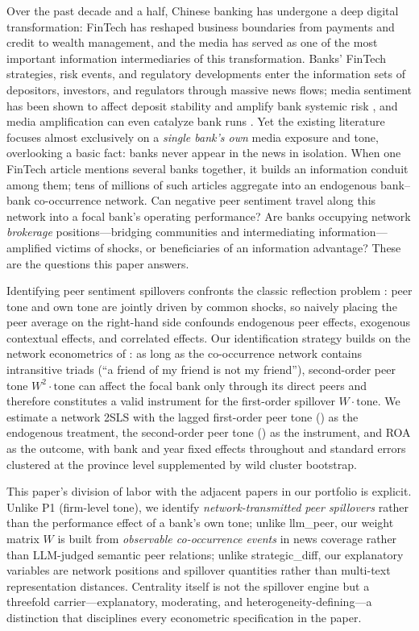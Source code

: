 Over the past decade and a half, Chinese banking has undergone a deep
digital transformation: FinTech has reshaped business boundaries from
payments and credit to wealth management, and the media has served as
one of the most important information intermediaries of this
transformation. Banks' FinTech strategies, risk events, and
regulatory developments enter the information sets of depositors,
investors, and regulators through massive news flows; media sentiment
has been shown to affect deposit stability and amplify bank systemic
risk \parencite{fang2024media}, and media amplification can even
catalyze bank runs \parencite{cookson2026social}. Yet the existing
literature focuses almost exclusively on a \emph{single bank's own}
media exposure and tone, overlooking a basic fact: banks never appear
in the news in isolation. When one FinTech article mentions several
banks together, it builds an information conduit among them; tens of
millions of such articles aggregate into an endogenous bank--bank
co-occurrence network. Can negative peer sentiment travel along this
network into a focal bank's operating performance? Are banks
occupying network \emph{brokerage} positions---bridging communities
and intermediating information---amplified victims of shocks, or
beneficiaries of an information advantage? These are the questions
this paper answers.

Identifying peer sentiment spillovers confronts the classic
reflection problem \parencite{manski1993reflection}: peer tone and
own tone are jointly driven by common shocks, so naively placing the
peer average on the right-hand side confounds endogenous peer
effects, exogenous contextual effects, and correlated effects. Our
identification strategy builds on the network econometrics of
\textcite{bramoulle2009identification}: as long as the co-occurrence
network contains intransitive triads (``a friend of my friend is not
my friend''), second-order peer tone $W^{2}\cdot\text{tone}$ can
affect the focal bank only through its direct peers and therefore
constitutes a valid instrument for the first-order spillover
$W\cdot\text{tone}$. We estimate a network 2SLS with the lagged
first-order peer tone () as the
endogenous treatment, the second-order peer tone
() as the instrument, and ROA as
the outcome, with bank and year fixed effects throughout and standard
errors clustered at the province level supplemented by wild cluster
bootstrap.

This paper's division of labor with the adjacent papers in our
portfolio is explicit. Unlike P1 (firm-level tone), we identify
\emph{network-transmitted peer spillovers} rather than the
performance effect of a bank's own tone; unlike llm\_peer, our weight
matrix $W$ is built from \emph{observable co-occurrence events} in
news coverage rather than LLM-judged semantic peer relations; unlike
strategic\_diff, our explanatory variables are network positions and
spillover quantities rather than multi-text representation
distances. Centrality itself is not the spillover engine but a
threefold carrier---explanatory, moderating, and
heterogeneity-defining---a distinction that disciplines every
econometric specification in the paper.

